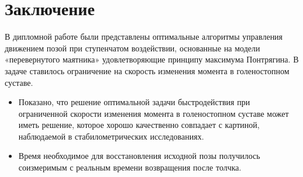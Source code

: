 \documentclass[a4paper,12pt, openany]{book}
\theoremstyle{plain} %
\theoremstyle{definition} %
\theoremstyle{remark} %
\numberwithin{equation}{chapter}
\begin{document}
{\newpage


\chapter*{Заключение}



В дипломной работе были представлены оптимальные алгоритмы управления
движением позой при ступенчатом воздействии, основанные на модели
«перевернутого маятника» удовлетворяющие принципу максимума Понтрягина.
В задаче ставилось ограничение на скорость изменения момента в голеностопном суставе.
\begin{itemize}
    \item Показано, что решение оптимальной задачи быстродействия при ограниченной скорости изменения момента в голеностопном суставе может иметь решение, которое хорошо качественно совпадает с картиной, наблюдаемой в стабилометрических исследованиях.
    \item Время необходимое для восстановления исходной позы получилось соизмеримым с реальным времени возвращения после толчка.
\end{itemize}




\newpage


}
\end{document}
